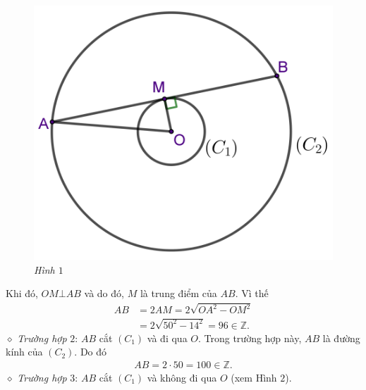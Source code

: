 \begin{multicols}{2}
\begin{figure}[H]
		\includegraphics[width= 1\linewidth]{P663H1}
		\caption{\small\textit{\color{thachthuctoanhoc}Hình $1$}}
		\vspace*{-10pt}
	\end{figure}
	Khi đó, $OM \bot AB$ và do đó, $M$ là trung điểm của $AB$. Vì thế
	\begin{align*}
		AB &= 2AM = 2\sqrt {O{A^2} - O{M^2}}  \\
		&= 2\sqrt {{{50}^2} - {{14}^2}}  = 96 \in \mathbb{Z}.
	\end{align*}
	$\diamond$ \textit{Trường hợp} $2$: $AB$ cắt  $(C_1)$ và đi qua $O$.
	\vskip 0.05cm
	Trong trường hợp này, $AB$ là đường kính của $(C_2).$ Do đó
	\begin{align*}
		AB = 2 \cdot 50 = 100 \in \mathbb{Z}.
	\end{align*}
	$\diamond$ \textit{Trường hợp} $3$: $AB$ cắt $(C_1)$ và không đi qua $O$ (xem Hình $2$).
	\begin{figure}[H]
		\vspace*{-5pt}
		\centering
		\captionsetup{labelformat= empty, justification=centering}

\end{figure}
\end{multicols}
